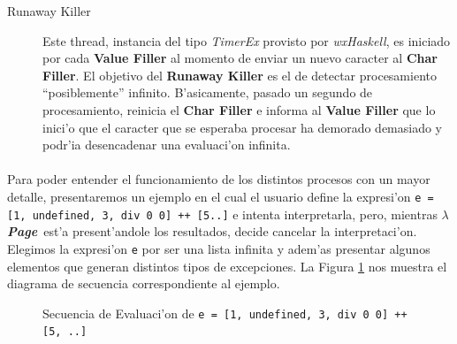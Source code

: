 \documentclass[a4paper]{article}
\newcommand{\hpage}{\textbf{\textsl{$\lambda$Page}}}
\begin{document}
\begin{description}
	\item[Runaway Killer] Este thread, instancia del tipo \textsl{TimerEx} provisto por \textsl{wxHaskell}, es iniciado por cada \textbf{Value Filler} al momento de enviar un nuevo caracter al \textbf{Char Filler}.  El objetivo del \textbf{Runaway Killer} es el de detectar procesamiento ``posiblemente'' infinito.  B'asicamente, pasado un segundo de procesamiento, reinicia el \textbf{Char Filler} e informa al \textbf{Value Filler} que lo inici'o que el caracter que se esperaba procesar ha demorado demasiado y podr'ia desencadenar una evaluaci'on infinita.
\end{description}
\paragraph{}Para poder entender el funcionamiento de los distintos procesos con un mayor detalle, presentaremos un ejemplo en el cual el usuario define la expresi'on \texttt{e = [1, undefined, 3, div 0 0] ++ [5..]} e intenta interpretarla, pero, mientras \hpage\ est'a present'andole los resultados, decide cancelar la interpretaci'on.  Elegimos la expresi'on \texttt{e} por ser una lista infinita y adem'as presentar algunos elementos que generan distintos tipos de excepciones.  La Figura \ref{seq1} nos muestra el diagrama de secuencia correspondiente al ejemplo.
\begin{figure}[hp]
	\begin{center}
		\caption{Secuencia de Evaluaci'on de \texttt{e = [1, undefined, 3, div 0 0] ++ [5, ..]}}
		\label{seq1}
	\end{center}
\end{figure}
\end{document}
